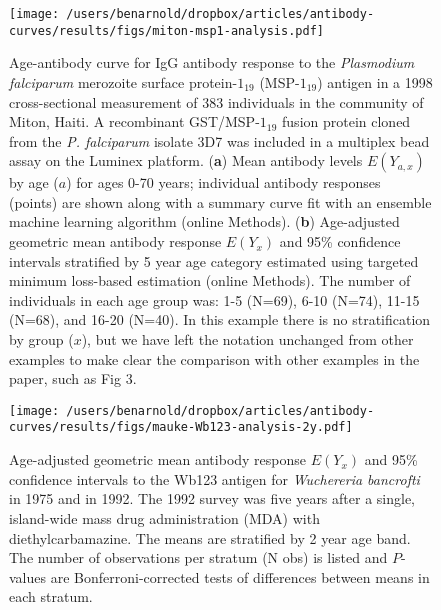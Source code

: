 \documentclass[11pt]{article}
\begin{document}
\clearpage
\begin{figure}[htbp]
\begin{center}
\texttt{[image: /users/benarnold/dropbox/articles/antibody-curves/results/figs/miton-msp1-analysis.pdf]}
\begin{minipage}{\textwidth}
\caption{Age-antibody curve for IgG antibody response to the \textit{Plasmodium falciparum} merozoite surface protein-$1_{19}$ (MSP-$1_{19}$) antigen in a 1998 cross-sectional measurement of 383 individuals in the community of Miton, Haiti. A recombinant GST/MSP-$1_{19}$ fusion protein cloned from the \textit{P. falciparum} isolate 3D7 was included in a multiplex bead assay on the Luminex platform. (\textbf{a}) Mean antibody levels $E(Y_{a,x})$ by age ($a$) for ages 0-70 years; individual antibody responses (points) are shown along with a summary curve fit with an ensemble machine learning algorithm (online Methods). (\textbf{b}) Age-adjusted geometric mean antibody response $E(Y_{x})$ and 95\% confidence intervals stratified by 5 year age category estimated using targeted minimum loss-based estimation (online Methods). The number of individuals in each age group was: 1-5 (N=69), 6-10 (N=74), 11-15 (N=68), and 16-20 (N=40). In this example there is no stratification by group ($x$), but we have left the notation unchanged from other examples to make clear the comparison with other examples in the paper, such as Fig 3.}
\label{fig:mitonEYxa}
\end{minipage}
\end{center}
\end{figure}

\begin{figure}[htbp]
\begin{center}
\texttt{[image: /users/benarnold/dropbox/articles/antibody-curves/results/figs/mauke-Wb123-analysis-2y.pdf]}
\begin{minipage}{0.75\textwidth}
\caption{Age-adjusted geometric mean antibody response $E(Y_{x})$ and 95\% confidence intervals to the Wb123 antigen for \textit{Wuchereria bancrofti} in 1975 and in 1992. The 1992 survey was five years after a single, island-wide mass drug administration (MDA) with diethylcarbamazine. The means are stratified by 2 year age band. The number of observations per stratum (N obs) is listed and $P$-values are Bonferroni-corrected tests of differences between means in each stratum.}
\label{fig:maukeS4}
\end{minipage}
\end{center}
\end{figure}
\end{document}
